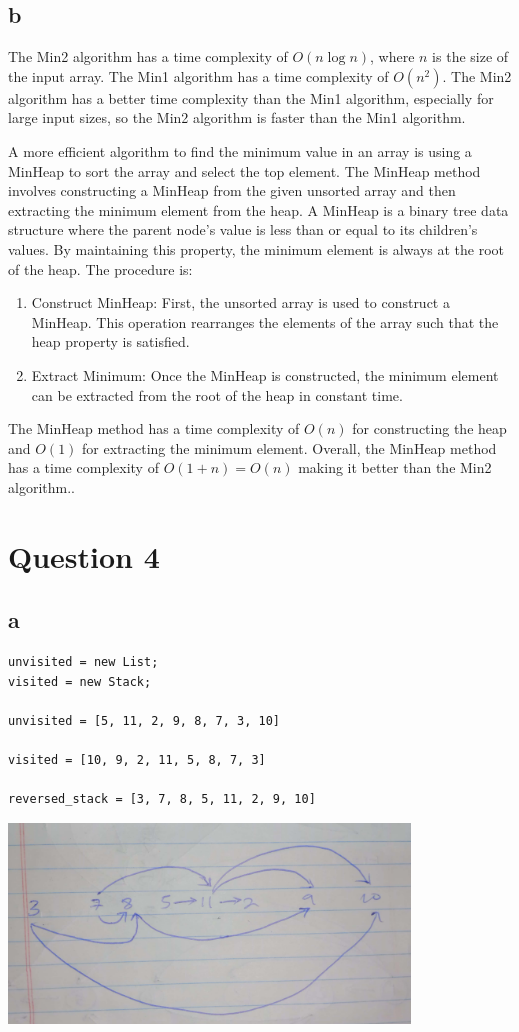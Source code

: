 \documentclass{article}
\begin{document}
\subsection*{b}
The Min2 algorithm has a time complexity of \( O(n \log n) \), where \( n \) is the size of the input array.
The Min1 algorithm has a time complexity of \( O(n^2) \).
The Min2 algorithm has a better time complexity than the Min1 algorithm, especially for large input sizes, so the Min2 algorithm is faster than the Min1 algorithm.

A more efficient algorithm to find the minimum value in an array is using a MinHeap to sort the array and select the top element.
The MinHeap method involves constructing a MinHeap from the given unsorted array and then extracting the minimum element from the heap. A MinHeap is a binary tree data structure where the parent node's value is less than or equal to its children's values. By maintaining this property, the minimum element is always at the root of the heap.
The procedure is:
\begin{enumerate}
    \item Construct MinHeap: First, the unsorted array is used to construct a MinHeap. This operation rearranges the elements of the array such that the heap property is satisfied.

    \item Extract Minimum: Once the MinHeap is constructed, the minimum element can be extracted from the root of the heap in constant time.
\end{enumerate}
The MinHeap method has a time complexity of \(O(n)\) for constructing the heap and \(O(1)\) for extracting the minimum element. 
Overall, the MinHeap method has a time complexity of \(O(1 + n) = O(n)\) making it better than the Min2 algorithm..
\newpage
\section*{Question 4}
\subsection*{a}
\begin{verbatim}
unvisited = new List;
visited = new Stack;

unvisited = [5, 11, 2, 9, 8, 7, 3, 10]

visited = [10, 9, 2, 11, 5, 8, 7, 3]

reversed_stack = [3, 7, 8, 5, 11, 2, 9, 10]

\end{verbatim}
\begin{center}
    \includegraphics[width=0.8\textwidth]{toposort1.jpg}
\end{center}
\end{document}
